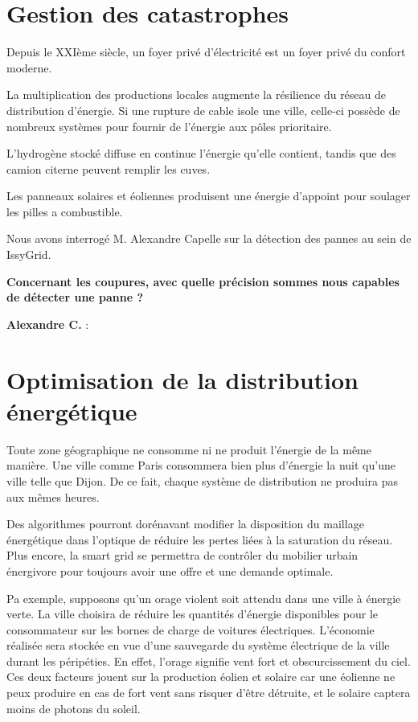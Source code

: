 \section{Gestion des catastrophes}

Depuis le XXIème siècle, un foyer privé d'électricité est un foyer privé du confort moderne.

La multiplication des productions locales augmente la résilience du réseau de distribution d'énergie.
Si une rupture de cable isole une ville, celle-ci possède de nombreux systèmes pour fournir
de l'énergie aux pôles prioritaire.

L'hydrogène stocké diffuse en continue l'énergie qu'elle contient, tandis que des camion citerne
peuvent remplir les cuves.

Les panneaux solaires et éoliennes produisent une énergie d'appoint pour soulager les pilles
a combustible.

Nous avons interrogé M. Alexandre Capelle sur la détection des pannes au sein de IssyGrid.

\textbf{Concernant les coupures, avec quelle précision sommes nous capables de détecter une panne ?}

\textbf{Alexandre C.} :


\section{Optimisation de la distribution énergétique}

Toute zone géographique ne consomme ni ne produit l'énergie de la même manière.
Une ville comme Paris consommera bien plus d'énergie la nuit qu'une ville telle que Dijon.
De ce fait, chaque système de distribution ne produira pas aux mêmes heures.

Des algorithmes pourront dorénavant modifier la disposition du maillage énergétique dans l'optique
de réduire les pertes liées à la saturation du réseau. Plus encore, la smart grid se permettra de contrôler
du mobilier urbain énergivore pour toujours avoir une offre et une demande optimale.

Pa exemple, supposons qu'un orage violent soit attendu dans une ville à énergie verte.
La ville choisira de réduire les quantités d'énergie disponibles pour le consommateur sur les bornes
de charge de voitures électriques.
L'économie réalisée sera stockée en vue d'une sauvegarde du système électrique de la ville durant les péripéties.
En effet, l'orage signifie vent fort et obscurcissement du ciel. Ces deux facteurs jouent sur la production
éolien et solaire car une éolienne ne peux produire en cas de fort vent sans risquer d'être détruite, et le solaire
captera moins de photons du soleil.

